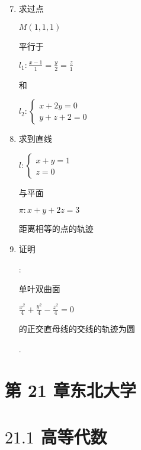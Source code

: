 \documentclass[10pt]{article}
\begin{document}
\begin{enumerate}
  \setcounter{enumi}{6}
  \item \begin{CJK}{UTF8}{mj}求过点\end{CJK} $M(1,1,1)$ \begin{CJK}{UTF8}{mj}平行于\end{CJK} $l_{1}: \frac{x-1}{1}=\frac{y}{2}=\frac{z}{1}$ \begin{CJK}{UTF8}{mj}和\end{CJK} $l_{2}:\left\{\begin{array}{l}x+2 y=0 \\ y+z+2=0\end{array}\right.$

  \item \begin{CJK}{UTF8}{mj}求到直线\end{CJK} $l:\left\{\begin{array}{l}x+y=1 \\ z=0\end{array}\right.$ \begin{CJK}{UTF8}{mj}与平面\end{CJK} $\pi: x+y+2 z=3$ \begin{CJK}{UTF8}{mj}距离相等的点的轨迹\end{CJK}

  \item \begin{CJK}{UTF8}{mj}证明\end{CJK}: \begin{CJK}{UTF8}{mj}单叶双曲面\end{CJK} $\frac{x^{2}}{4}+\frac{y^{2}}{4}-\frac{z^{2}}{4}=0$ \begin{CJK}{UTF8}{mj}的正交直母线的交线的轨迹为圆\end{CJK}.

\end{enumerate}
\section{第 21 章东北大学}
\section{$21.1$ 高等代数}
\end{document}
